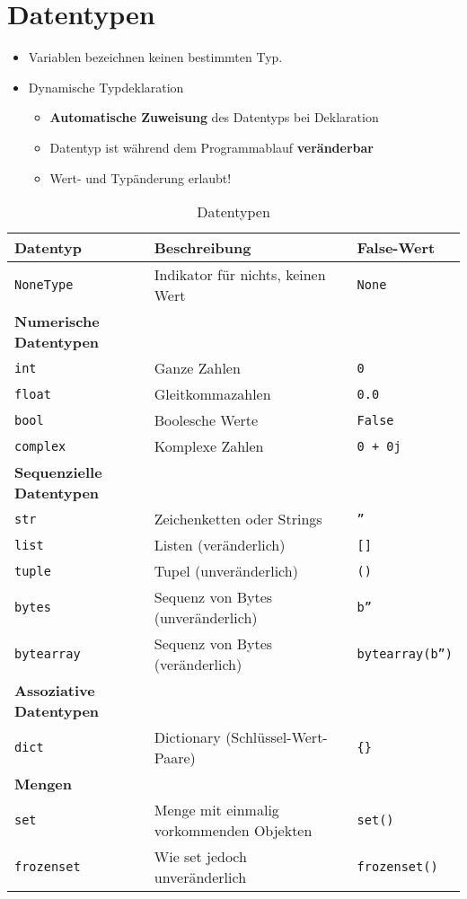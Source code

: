 \section{Datentypen}
\begin{itemize}
	\item Variablen bezeichnen keinen bestimmten Typ.
	\item Dynamische Typdeklaration
	\begin{itemize}
		\item \textbf{Automatische Zuweisung} des Datentyps bei Deklaration
		\item Datentyp ist während dem Programmablauf \textbf{veränderbar}
		\item Wert- und Typänderung erlaubt!
	\end{itemize}
\end{itemize}
\begin{table}[H]
\begin{threeparttable}
	\caption{Datentypen}
	\label{tab:T_Datentypen}
	\begin{tabular}{|l|l|l|}
		\hline 
		\textbf{Datentyp} &\textbf{Beschreibung} &\textbf{False-Wert}\\
		\hline
		\texttt{NoneType} &Indikator für nichts, keinen Wert &\texttt{None}\\ 
		\hline
		\textbf{Numerische Datentypen}&&\\
		\texttt{int} &Ganze Zahlen &\texttt{0}\\ 
		\texttt{float} &Gleitkommazahlen &\texttt{0.0}\\ 
		\texttt{bool} &Boolesche Werte &\texttt{False}\\ 
		\texttt{complex} &Komplexe Zahlen &\texttt{0 + 0j}\\ 
		\hline 
		\textbf{Sequenzielle Datentypen}&&\\
		\texttt{str} &Zeichenketten oder Strings &\texttt{''}\\
		\texttt{list} &Listen (veränderlich) &\texttt{[]}\\
		\texttt{tuple} &Tupel (unveränderlich) &\texttt{()}\\
		\texttt{bytes} &Sequenz von Bytes (unveränderlich) &\texttt{b''}\\
		\texttt{bytearray} &Sequenz von Bytes (veränderlich) &\texttt{bytearray(b'')}\\
		\hline
		\textbf{Assoziative Datentypen}&&\\
		\texttt{dict} &Dictionary (Schlüssel-Wert-Paare) &\texttt{\{\}}\\
		\hline
		\textbf{Mengen}&&\\
		\texttt{set} &Menge mit einmalig vorkommenden Objekten &\texttt{set()}\\
		\texttt{frozenset} &Wie set jedoch unveränderlich &\texttt{frozenset()}\\
		\hline
	\end{tabular}
\end{threeparttable}
\end{table}

